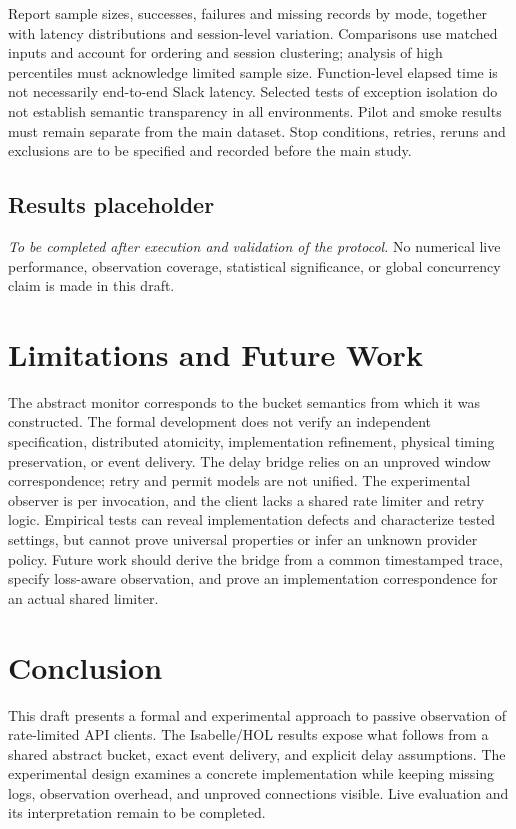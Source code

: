 \documentclass[10pt,twocolumn]{article}
\begin{document}
Report sample sizes, successes, failures and missing records by mode, together with latency distributions and session-level variation. Comparisons use matched inputs and account for ordering and session clustering; analysis of high percentiles must acknowledge limited sample size. Function-level elapsed time is not necessarily end-to-end Slack latency. Selected tests of exception isolation do not establish semantic transparency in all environments. Pilot and smoke results must remain separate from the main dataset. Stop conditions, retries, reruns and exclusions are to be specified and recorded before the main study.

\subsection{Results placeholder}
\emph{To be completed after execution and validation of the protocol.} No numerical live performance, observation coverage, statistical significance, or global concurrency claim is made in this draft.

\section{Limitations and Future Work}
The abstract monitor corresponds to the bucket semantics from which it was constructed. The formal development does not verify an independent specification, distributed atomicity, implementation refinement, physical timing preservation, or event delivery. The delay bridge relies on an unproved window correspondence; retry and permit models are not unified. The experimental observer is per invocation, and the client lacks a shared rate limiter and retry logic. Empirical tests can reveal implementation defects and characterize tested settings, but cannot prove universal properties or infer an unknown provider policy. Future work should derive the bridge from a common timestamped trace, specify loss-aware observation, and prove an implementation correspondence for an actual shared limiter.

\section{Conclusion}
This draft presents a formal and experimental approach to passive observation of rate-limited API clients. The Isabelle/HOL results expose what follows from a shared abstract bucket, exact event delivery, and explicit delay assumptions. The experimental design examines a concrete implementation while keeping missing logs, observation overhead, and unproved connections visible. Live evaluation and its interpretation remain to be completed.

\small


\end{document}
